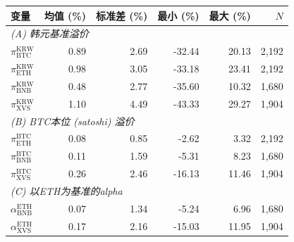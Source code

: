 \begin{tabular}{lrrrrr}
\toprule
变量 & 均值 (\%) & 标准差 (\%) & 最小 (\%) & 最大 (\%) & $N$ \\
\midrule
\multicolumn{6}{l}{\emph{(A) 韩元基准溢价}} \\
\quad $\pi^{\text{KRW}}_{\text{BTC}}$ & 0.89 & 2.69 & -32.44 & 20.13 & 2,192 \\
\quad $\pi^{\text{KRW}}_{\text{ETH}}$ & 0.98 & 3.05 & -33.18 & 23.41 & 2,192 \\
\quad $\pi^{\text{KRW}}_{\text{BNB}}$ & 0.48 & 2.77 & -35.60 & 10.32 & 1,680 \\
\quad $\pi^{\text{KRW}}_{\text{XVS}}$ & 1.10 & 4.49 & -43.33 & 29.27 & 1,904 \\
\midrule\multicolumn{6}{l}{\emph{(B) BTC本位 (satoshi) 溢价}} \\
\quad $\pi^{\text{BTC}}_{\text{ETH}}$ & 0.08 & 0.85 & -2.62 & 3.32 & 2,192 \\
\quad $\pi^{\text{BTC}}_{\text{BNB}}$ & 0.11 & 1.59 & -5.31 & 8.23 & 1,680 \\
\quad $\pi^{\text{BTC}}_{\text{XVS}}$ & 0.26 & 2.46 & -16.13 & 11.46 & 1,904 \\
\midrule\multicolumn{6}{l}{\emph{(C) 以ETH为基准的alpha}} \\
\quad $\alpha^{\text{ETH}}_{\text{BNB}}$ & 0.07 & 1.34 & -5.24 & 6.96 & 1,680 \\
\quad $\alpha^{\text{ETH}}_{\text{XVS}}$ & 0.17 & 2.16 & -15.03 & 11.95 & 1,904 \\
\bottomrule
\end{tabular}